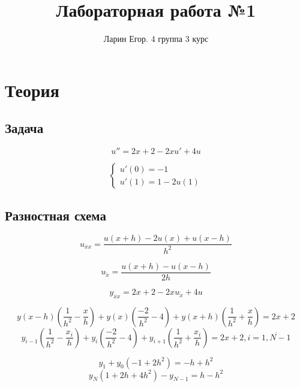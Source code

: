 \documentclass{article}
\title{Лабораторная работа №1}
\author{Ларин Егор. 4 группа 3 курс}
\begin{document}
\maketitle
\section*{Теория}
\subsection*{Задача}
\begin{equation*}
    u'' = 2x + 2 - 2xu' + 4 u
\end{equation*}

$$\begin{cases}
    u'(0) = -1\\
    u'(1) = 1 - 2u(1)
\end{cases}$$

\subsection*{Разностная схема}

\begin{equation*}
    u_{\overline{x}x} = \frac{u(x+h) - 2u(x) + u(x-h)}{h^2}
\end{equation*}

\begin{equation*}
    u_{\mathring{x}} = \frac{u(x+h) - u(x-h)}{2h}
\end{equation*}

$$y_{\overline{x}x} = 2 x + 2 - 2x u_{\mathring{x}} + 4u$$

$$y(x-h) \left(\frac{1}{h^2} - \frac{x}{h}\right) + y(x) \left(\frac{-2}{h^2} - 4\right) + y(x+h) \left(\frac{1}{h^2} + \frac{x}{h}\right) = 2x + 2$$
$$y_{i-1} \left(\frac{1}{h^2} - \frac{x_i}{h}\right) + y_i \left(\frac{-2}{h^2} - 4\right) + y_{i+1} \left(\frac{1}{h^2} + \frac{x_i}{h}\right) = 2x + 2, i = \overline{1, N-1}$$ 

$$y_1 + y_0 \left(-1 +2h^2\right) = -h + h^2$$
$$y_N \left(1 + 2h + 4h^2\right) - y_{N-1} = h - h^2$$
\end{document}
